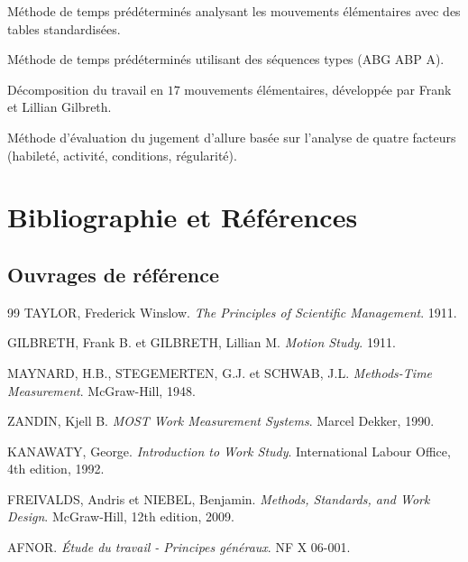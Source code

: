 \documentclass[a4paper,12pt]{article}
\begin{document}
\begin{description}[labelwidth=4cm]
    \item[MTM (Methods-Time Measurement)] Méthode de temps prédéterminés analysant les mouvements élémentaires avec des tables standardisées.
    
    \item[MOST (Maynard Operation Sequence Technique)] Méthode de temps prédéterminés utilisant des séquences types (ABG ABP A).
    
    \item[Therbligs] Décomposition du travail en $17$ mouvements élémentaires, développée par Frank et Lillian Gilbreth.
    
    \item[Levelling] Méthode d'évaluation du jugement d'allure basée sur l'analyse de quatre facteurs (habileté, activité, conditions, régularité).
\end{description}

\section{Bibliographie et Références}

\subsection{Ouvrages de référence}

\begin{thebibliography}{99}
     TAYLOR, Frederick Winslow. \textit{The Principles of Scientific Management}. 1911.
    
     GILBRETH, Frank B. et GILBRETH, Lillian M. \textit{Motion Study}. 1911.
    
     MAYNARD, H.B., STEGEMERTEN, G.J. et SCHWAB, J.L. \textit{Methods-Time Measurement}. McGraw-Hill, 1948.
    
     ZANDIN, Kjell B. \textit{MOST Work Measurement Systems}. Marcel Dekker, 1990.
    
     KANAWATY, George. \textit{Introduction to Work Study}. International Labour Office, 4th edition, 1992.
    
     FREIVALDS, Andris et NIEBEL, Benjamin. \textit{Methods, Standards, and Work Design}. McGraw-Hill, 12th edition, 2009.
    
     AFNOR. \textit{Étude du travail - Principes généraux}. NF X 06-001.
\end{thebibliography}
\end{document}
